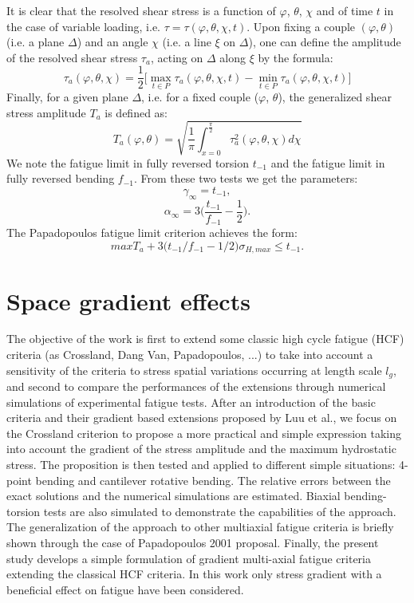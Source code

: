 \documentclass[3p,times,procedia,number]{elsarticle}
\begin{document}
         It is clear that the resolved shear stress is a function of
         $\varphi$, $\theta$, $\chi$ and of time $t$ in the case of variable loading, i.e. $\tau=\tau(\varphi, \theta, \chi, t)$. Upon fixing a couple $(\varphi, \theta)$ (i.e. a plane
         $\Delta$) and an angle $\chi$ (i.e. a line $\xi$ on $\Delta$), one can define the amplitude of the resolved shear stress $\tau_a$, acting on $\Delta$
         along $\xi$ by the formula:
         \begin{equation}
         	\tau_a(\varphi,\theta,\chi)=\frac{1}{2}\big[\max \limits_{t\in P}\tau_a(\varphi,\theta,\chi ,t)-\min \limits_{t\in P}\tau_a(\varphi,\theta,\chi ,t)\big]
         \end{equation}
         Finally, for a given plane $\Delta$, i.e. for a fixed couple ($\varphi$, $\theta$),
         the generalized shear stress amplitude $T_a$ is defined as:
         \begin{equation}
         	T_a(\varphi,\theta)=\sqrt{\frac{1}{\pi}\int_{x=0}^{\frac{\pi}{2}} \tau_a^2(\varphi,\theta,\chi)d\chi}
         	\label{Ta}
         \end{equation}
         We note the fatigue limit in fully reversed torsion $t_{-1}$ and the fatigue limit in fully reversed bending $f_{-1}$. From these two tests we get the parameters:
         $$\gamma_\infty=t_{-1},$$ 
         $$\alpha_\infty=3\big(\frac{t_{-1}}{f_{-1}}-\frac{1}{2}\big).$$
         The Papadopoulos fatigue limit criterion achieves the form:
         \begin{equation}
         	maxT_a+3\big(t_{-1}/f_{-1}-1/2\big)\sigma_{H,max}\leqslant t_{-1}.
         	\label{eq:papadopoulos}
         \end{equation}
\section{Space gradient effects}
The objective of the work is first to extend some classic high cycle fatigue (HCF) criteria (as Crossland, Dang Van, Papadopoulos, ...) to take into account a sensitivity of the criteria to stress spatial variations occurring at length scale $l_g$, and second to compare the performances of the extensions through numerical simulations of experimental fatigue tests. After an introduction of the basic criteria and their gradient based extensions proposed by Luu et al., we focus on the Crossland criterion to propose a more practical and simple expression taking into account the gradient of the stress amplitude and the maximum hydrostatic stress. The proposition is then tested and applied to different simple situations: 4-point bending and cantilever rotative bending.  The relative errors between the exact solutions and the numerical simulations are estimated. Biaxial  bending-torsion tests are also simulated to demonstrate the capabilities of the approach. The generalization of the approach to other multiaxial fatigue criteria is briefly shown through the case of Papadopoulos 2001 proposal. Finally, the present study develops a simple formulation of gradient multi-axial fatigue criteria extending the classical HCF criteria. In this work only stress gradient with a beneficial effect on fatigue have been considered.
\end{document}
